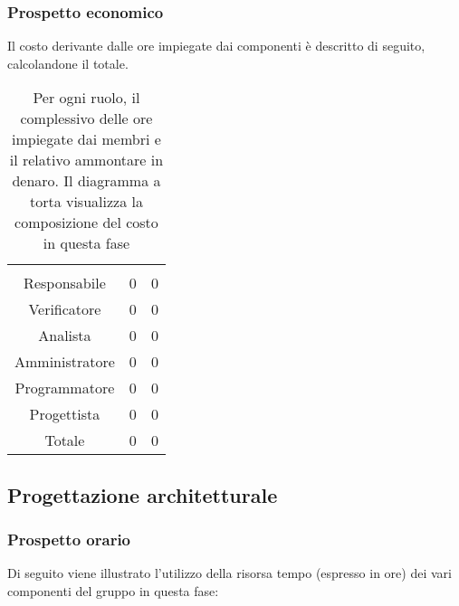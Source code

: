 \subsubsection{Prospetto economico}
Il costo derivante dalle ore impiegate dai componenti è descritto di seguito, calcolandone il totale.

\begin{table}[H]
{\setlength{\parindent}{0cm}
\begin{minipage}{.43\textwidth}
	\begin{tabular}{ccc}
	\rowcolorhead
	\headertitle{Ruolo} & \headertitle{Ore} & \headertitle{Costo(€)}\\
	Responsabile & 0 & 0\\
	Verificatore & 0 & 0\\
	Analista & 0 & 0\\
	Amministratore & 0 & 0\\
	Programmatore & 0 & 0\\
	Progettista & 0 & 0\\
	\hline
	Totale & 0& 0\\
	\end{tabular}
\end{minipage}%
\begin{minipage}{.57\textwidth}
\end{minipage} }
\caption{Per ogni ruolo, il complessivo delle ore impiegate dai membri e il relativo ammontare in denaro. Il diagramma a torta visualizza la composizione del costo in questa fase}
\end{table}

\subsection{Progettazione architetturale}

\subsubsection{Prospetto orario}
Di seguito viene illustrato l'utilizzo della risorsa tempo (espresso in ore) dei vari componenti del gruppo in questa fase:

